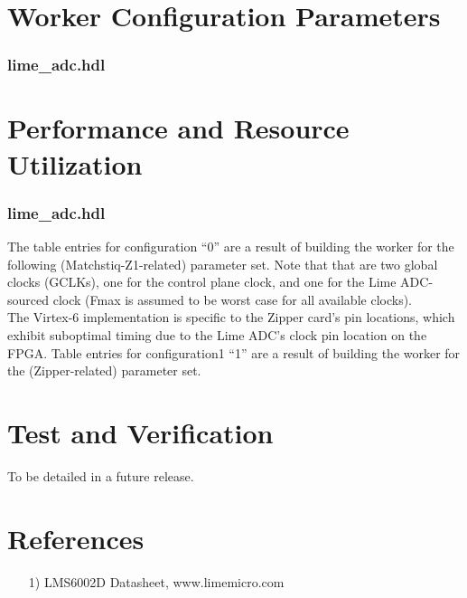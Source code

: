 \documentclass{article}
\def\comp{lime\_adc}
\edef\ecomp{lime_adc}
\begin{document}
\begin{landscape}
\section*{Worker Configuration Parameters}
\subsubsection*{\comp.hdl}
%
\section*{Performance and Resource Utilization}
\subsubsection*{\comp.hdl}
The table entries for configuration ``0'' are a result of building the worker for the following (Matchstiq-Z1-related) parameter set. Note that that are two global clocks (GCLKs), one for the control plane clock, and one for the Lime ADC-sourced clock (Fmax is assumed to be worst case for all available clocks).\\

The Virtex-6 implementation is specific to the Zipper card's pin locations, which exhibit suboptimal timing due to the Lime ADC's clock pin location on the FPGA. Table entries for configuration1 ``1'' are a result of building the worker for the (Zipper-related) parameter set.\\

%
\end{landscape}
\section*{Test and Verification}
\begin{flushleft}
 To be detailed in a future release.
\end{flushleft}
\section*{References}
\begin{flushleft}
	\begin{itemize}
		\item[1)] LMS6002D Datasheet, www.limemicro.com
	\end{itemize}
\end{flushleft}
\end{document}
